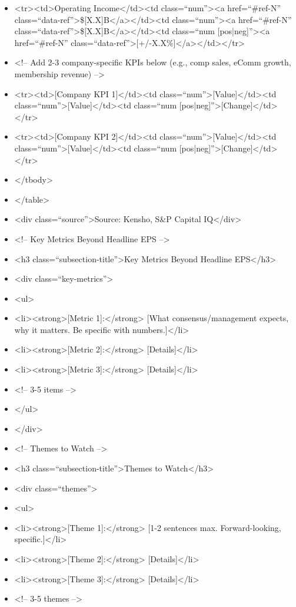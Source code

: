 \documentclass[11pt]{article}
\begin{document}
\begin{itemize}[leftmargin=*,itemsep=2pt,topsep=2pt]
\item {} <tr><td>Operating Income</td><td class=``num''><a href=``\#ref-N'' class=``data-ref''>\$[X.X]B</a></td><td class=``num''><a href=``\#ref-N'' class=``data-ref''>\$[X.X]B</a></td><td class=``num [pos|neg]''><a href=``\#ref-N'' class=``data-ref''>[+/-X.X\%]</a></td></tr>
\item {} <!-- Add 2-3 company-specific KPIs below (e.g., comp sales, eComm growth, membership revenue) -->
\item {} <tr><td>[Company KPI 1]</td><td class=``num''>[Value]</td><td class=``num''>[Value]</td><td class=``num [pos|neg]''>[Change]</td></tr>
\item {} <tr><td>[Company KPI 2]</td><td class=``num''>[Value]</td><td class=``num''>[Value]</td><td class=``num [pos|neg]''>[Change]</td></tr>
\item {} </tbody>
\item {} </table>
\item {} <div class=``source''>Source: Kensho, S\&P Capital IQ</div>
\item {} <!-- Key Metrics Beyond Headline EPS -->
\item {} <h3 class=``subsection-title''>Key Metrics Beyond Headline EPS</h3>
\item {} <div class=``key-metrics''>
\item {} <ul>
\item {} <li><strong>[Metric 1]:</strong> [What consensus/management expects, why it matters. Be specific with numbers.]</li>
\item {} <li><strong>[Metric 2]:</strong> [Details]</li>
\item {} <li><strong>[Metric 3]:</strong> [Details]</li>
\item {} <!-- 3-5 items -->
\item {} </ul>
\item {} </div>
\item {} <!-- Themes to Watch -->
\item {} <h3 class=``subsection-title''>Themes to Watch</h3>
\item {} <div class=``themes''>
\item {} <ul>
\item {} <li><strong>[Theme 1]:</strong> [1-2 sentences max. Forward-looking, specific.]</li>
\item {} <li><strong>[Theme 2]:</strong> [Details]</li>
\item {} <li><strong>[Theme 3]:</strong> [Details]</li>
\item {} <!-- 3-5 themes -->

\end{itemize}
\end{document}
